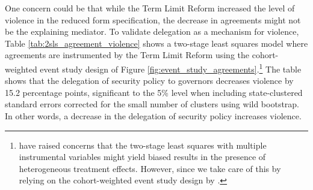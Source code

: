 \documentclass[12pt]{amsart}
\numberwithin{equation}{section}
\theoremstyle{definition}
\theoremstyle{definition}
\theoremstyle{definition}
\begin{document}
One concern could be that while the Term Limit Reform increased the level of violence in the reduced form specification, the decrease in agreements might not be the explaining mediator. To validate delegation as a mechanism for violence, Table \ref{tab:2sls_agreement_violence} shows a two-stage least squares model where agreements are instrumented by the Term Limit Reform using the cohort-weighted event study design of Figure \ref{fig:event_study_agreements}.\footnote{\citet{mostad_etal_2020} have raised concerns that the two-stage least squares with multiple instrumental variables might yield biased results in the presence of heterogeneous treatment effects. However, since we take care of this by relying on the cohort-weighted event study design by \citet{abraham_sun_2020}.} The table shows that the delegation of security policy to governors decreases violence by 15.2 percentage points, significant to the 5\% level when including state-clustered standard errors corrected for the small number of clusters using wild bootstrap. In other words, a decrease in the delegation of security policy increases violence. 
   
\end{document}
